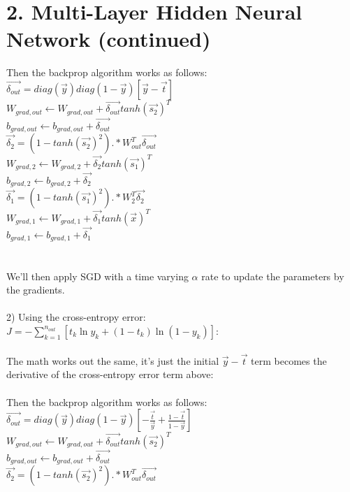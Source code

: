 \documentclass[11pt]{article}
\begin{document}
\section*{2. Multi-Layer Hidden Neural Network (continued)}
Then the backprop algorithm works as follows: \\
$ \vec{\delta_{out}} = diag(\vec{y}) diag(1 - \vec{y}) [ \vec{y} - \vec{t}] $ \\
$ W_{grad, out} \leftarrow W_{grad,out} + \vec{\delta_{out}} tanh(\vec{s_2})^T $ \\
$ b_{grad, out} \leftarrow b_{grad,out} + \vec{\delta_{out}}  $ \\
$ \vec{\delta_2} = (1 - tanh(\vec{s_2})^2) .* W_{out}^T \vec{\delta_{out}} $ \\
$ W_{grad, 2} \leftarrow W_{grad,2} + \vec{\delta_{2}} tanh(\vec{s_1})^T $ \\
$ b_{grad, 2} \leftarrow b_{grad,2} + \vec{\delta_{2}} $ \\
$ \vec{\delta_1} = (1 - tanh(\vec{s_1})^2) .* W_{2}^T \vec{\delta_{2}} $ \\
$ W_{grad, 1} \leftarrow W_{grad,1} + \vec{\delta_{1}} tanh(\vec{x})^T $ \\
$ b_{grad, 1} \leftarrow b_{grad,1} + \vec{\delta_{1}} $ \\
\\\\
We'll then apply SGD with a time varying $\alpha$ rate to update the parameters by the gradients.
\\\\
2) Using the cross-entropy error: $J = - \sum_{k=1}^{n_{out}} [t_k \ln y_k + (1 - t_k) \ln (1 - y_k)] $:
\\\\
The math works out the same, it's just the initial $\vec{y} - \vec{t}$ term becomes the derivative of the cross-entropy error term above:
\\\\
Then the backprop algorithm works as follows: \\
$ \vec{\delta_{out}} = diag(\vec{y}) diag(1 - \vec{y}) [ - \frac{\vec{t}}{\vec{y}} + \frac{ 1 - \vec{t}}{1 - \vec{y}} ]$ \\
$ W_{grad, out} \leftarrow W_{grad,out} + \vec{\delta_{out}} tanh(\vec{s_2})^T $ \\
$ b_{grad, out} \leftarrow b_{grad,out} + \vec{\delta_{out}}  $ \\
$ \vec{\delta_2} = (1 - tanh(\vec{s_2})^2) .* W_{out}^T \vec{\delta_{out}} $ \\
\end{document}
